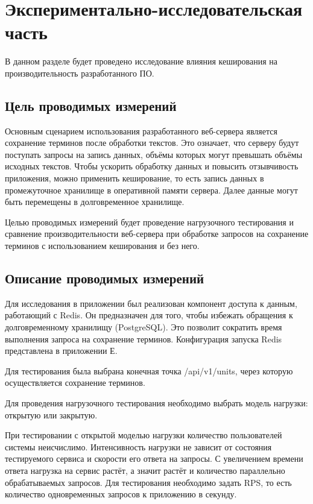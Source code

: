 \section{Экспериментально-исследовательская часть}

В данном разделе будет проведено исследование влияния кеширования на производительность разработанного ПО.

\subsection{Цель проводимых измерений}

Основным сценарием использования разработанного веб-сервера является сохранение терминов после обработки текстов. Это означает, что серверу будут поступать запросы на запись данных, объёмы которых могут превышать объёмы исходных текстов. Чтобы ускорить обработку данных и повысить отзывчивость приложения, можно применить кеширование, то есть запись данных в промежуточное хранилище в оперативной памяти сервера. Далее данные могут быть перемещены в долговременное хранилище.

Целью проводимых измерений будет проведение нагрузочного тестирования и сравнение производительности веб-сервера при обработке запросов на сохранение терминов с использованием кеширования и без него.


	
\subsection{Описание проводимых измерений}

Для исследования в приложении был реализован компонент доступа к данным, работающий с Redis. Он предназначен для того, чтобы избежать обращения к долговременному хранилищу (PostgreSQL). Это позволит сократить время выполнения запроса на сохранение терминов. Конфигурация запуска Redis представлена в приложении Е.

Для тестирования была выбрана конечная точка /api/v1/units, через которую осуществляется сохранение терминов. 

Для проведения нагрузочного тестирования необходимо выбрать модель нагрузки: открытую или закрытую.

При тестировании с открытой моделью нагрузки количество пользователей системы неисчислимо. Интенсивность нагрузки не зависит от состояния тестируемого сервиса и скорости его ответа на запросы. %
С увеличением времени ответа нагрузка на сервис растёт, а значит растёт и количество параллельно обрабатываемых запросов.
Для тестирования необходимо задать RPS, то есть количество одновременных запросов к приложению в секунду.


